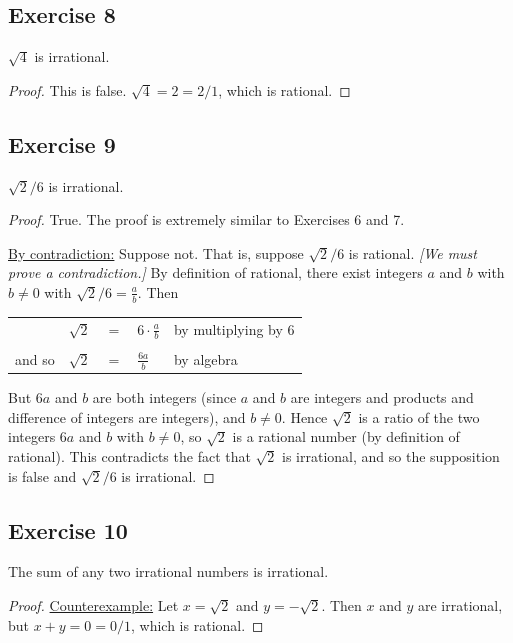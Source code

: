 \documentclass[14pt]{extarticle}
\newcommand{\dps}{\displaystyle}
\newcommand{\cy}{\color{cyan}}
\begin{document}
\subsection{Exercise 8}
$\sqrt{4}$ is irrational.

\begin{proof}
This is false. $\sqrt{4} = 2 = 2/1$, which is rational.
\end{proof}

\subsection{Exercise 9}
$\sqrt{2}/6$ is irrational.

\begin{proof}
True. The proof is extremely similar to Exercises 6 and 7. 

\underline{By contradiction:} Suppose not. That is, suppose
$\sqrt{2}/6$ is rational. {\it [We must prove a contradiction.]} By definition of rational, there exist integers $a$ and $b$ with $b \neq 0$ with $\sqrt{2}/6 = \frac{a}{b}$. Then

\begin{center}
\begin{tabular}{lrcll}
& $\sqrt{2}$ & $=$ & $\dps 6 \cdot\frac{a}{b}$ & {\cy by multiplying by 6} \\
\\
and so & $\sqrt{2}$ & = & $\dps\frac{6a}{b}$ & {\cy by algebra}\\
\end{tabular}
\end{center}

But $6a$ and $b$ are both integers (since $a$ and $b$ are integers and products and difference of integers are integers), and $b \neq 0$. Hence $\sqrt{2}$ is a ratio of the two integers $6a$ and $b$ with $b \neq 0$, so $\sqrt{2}$ is a rational number (by definition of rational). This contradicts the fact that $\sqrt{2}$ is irrational, and so the supposition is false and $\sqrt{2}/6$ is irrational.
\end{proof}

\subsection{Exercise 10}
The sum of any two irrational numbers is irrational.

\begin{proof}
\underline{Counterexample:} Let $x = \sqrt{2}$ and $y = -\sqrt{2}$. Then $x$ and $y$ are irrational, but $x + y = 0  = 0/1$, which is rational.
\end{proof}
\end{document}
